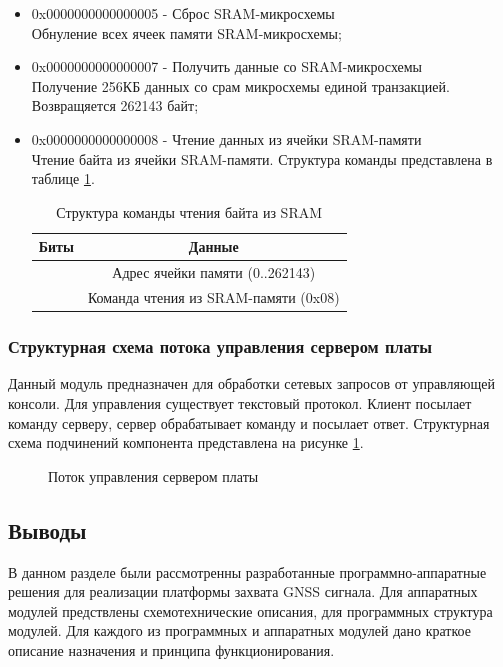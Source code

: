 \begin{itemize}
\item 0x0000000000000005 - Сброс SRAM-микросхемы \\ 
	Обнуление всех ячеек памяти SRAM-микросхемы;

\item 0x0000000000000007 - Получить данные со SRAM-микросхемы \\ 
	Получение 256КБ данных со срам микросхемы единой транзакцией. Возвращяется 262143 байт;

\item 0x0000000000000008 - Чтение данных из ячейки SRAM-памяти \\ 
	Чтение байта из ячейки SRAM-памяти. Структура команды представлена в таблице \ref{tab:read_sram}.
	\begin{table}[H]
	\begin{center}
	\caption{Структура команды чтения байта из SRAM}
	\label{tab:read_sram}
	\begin{tabular}{|c|c|}
		\hline
			Биты & Данные \\
		\hline
			[25:08] & Адрес ячейки памяти (0..262143) \\
		\hline
			[07:00] & Команда чтения из SRAM-памяти (0x08) \\
		\hline
	\end{tabular}
	\end{center}
	\end{table}
\end{itemize}


\subsubsection*{Структурная схема потока управления сервером платы}
Данный модуль предназначен для обработки сетевых запросов от управляющей консоли. Для управления существует текстовый протокол.
Клиент посылает команду серверу, сервер обрабатывает команду и посылает ответ. Структурная схема подчинений компонента 
представлена на рисунке \ref{pic:gui_server}.

\begin{figure}[H]
\begin{center}
\end{center}
\caption{Поток управления сервером платы}
\label{pic:gui_server}
\end{figure}


\subsection*{Выводы}
В данном разделе были рассмотренны разработанные программно-аппаратные решения для реализации платформы захвата GNSS сигнала.
Для аппаратных модулей предствлены схемотехнические описания, для программных структура модулей. Для каждого из программных
и аппаратных модулей дано краткое описание назначения и принципа функционирования.

\newpage
